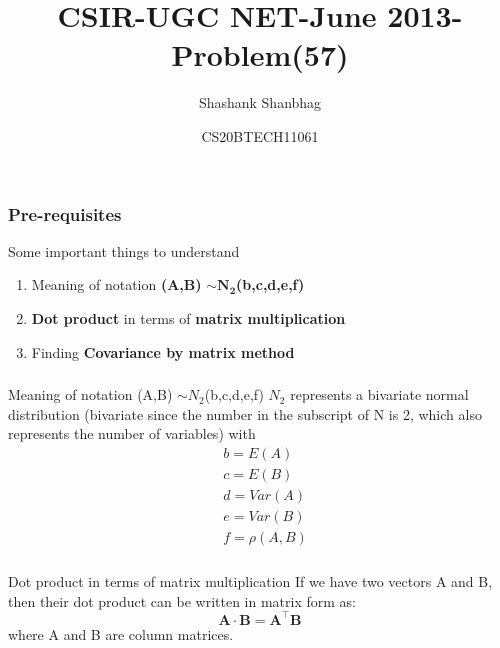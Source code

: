 \documentclass{beamer}
\title{CSIR-UGC NET-June 2013-Problem(57)}
\author{Shashank Shanbhag}
\date{CS20BTECH11061}
\renewcommand{\vec}[1]{\mathbf{#1}}
\begin{document}
\begin{frame}
\titlepage
\end{frame}

\begin{frame}
    \frametitle{Pre-requisites}
    \begin{block}{Some important things to understand}
      \begin{enumerate}
        \item Meaning of notation \textbf{(A,B)} $\mathbf{\sim N_2}$\textbf{(b,c,d,e,f)}
        \item \textbf{Dot product} in terms of \textbf{matrix multiplication}
        \item Finding \textbf{Covariance by matrix method}
      \end{enumerate}
    \end{block}
\end{frame}

\begin{frame}
\frametitle{}
    \begin{block}{Meaning of notation (A,B) $\sim N_2$(b,c,d,e,f)}
     $N_2$ represents a bivariate normal distribution (bivariate since the number in the subscript of N is 2, which also represents the number of variables) with
     \begin{align}
         &b = E(A) \\
         &c = E(B) \\
         &d = Var(A) \\
         &e = Var(B) \\
         &f = \rho(A,B)
     \end{align}
    \end{block}
\end{frame}

\begin{frame}
    \frametitle{}
    \begin{block}{Dot product in terms of matrix multiplication}
     If we have two vectors A and B, then their dot product can be written in matrix form as:\\
     \begin{equation}
         \vec{A} \cdot \vec{B} = \vec{A^\top} \vec{B} 
     \end{equation}
    where A and B are column matrices.
    \end{block}
\end{frame}
\end{document}

